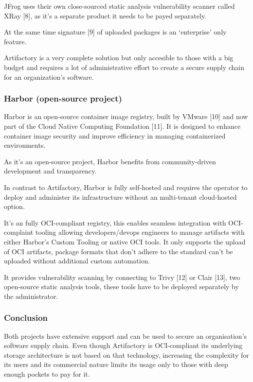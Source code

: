 \documentclass{article}
\begin{document}
  JFrog uses their own close-sourced static analysis vulnerability scanner called XRay [8], as it's a separate product it needs to be payed separately.

  At the same time signature [9] of uploaded packages is an `enterprise' only feature.

  Artifactory is a very complete solution but only accesible to those with a big budget and requires a lot of administrative effort to create a secure supply chain for an organization's software.
  
  \subsubsection{Harbor (open-source project)}

  Harbor is an open-source container image registry, built by VMware [10] and now part of the Cloud Native Computing Foundation [11]. It is designed to enhance container image security and improve efficiency in managing containerized environments.

  As it's an open-source project, Harbor benefits from community-driven development and transparency.

  In contrast to Artifactory, Harbor is fully self-hosted and requires the operator to deploy and administer its infrastructure without an multi-tenant cloud-hosted option.

  It's an fully OCI-compliant registry, this enables seamless integration with OCI-complaint tooling allowing developers/devops engineers to manage artifacts with either Harbor's Custom Tooling or native OCI tools. It only supports the upload of OCI artifacts, package formats that don't adhere to the standard can't be uploaded without additional custom automation.

  It provides vulnerability scanning by connecting to Trivy [12] or Clair [13], two open-source static analysis tools, these tools have to be deployed separately by the administrator.

  \subsubsection{Conclusion}

  Both projects have extensive support and can be used to secure an organisation's software supply chain.
  Even though Artifactory is OCI-compliant its underlying storage architecture is not based on that technology, increasing the complexity for its users and its commercial nature limits its usage only to those with deep enough pockets to pay for it.
\end{document}
